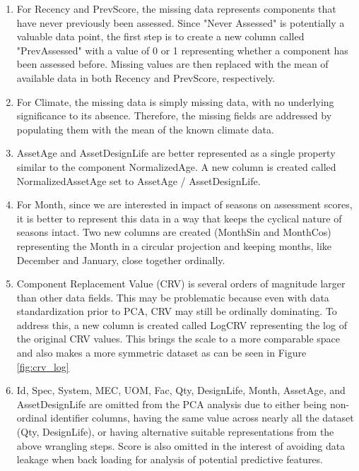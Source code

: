 \documentclass[NewProceedings,letterpaper,NoPageNumbers,NoLineNumbers, DoubleSpace]{ascelike-new}
\begin{document}
\begin{enumerate}
    \item For Recency and PrevScore, the missing data represents components that have never previously been assessed. Since "Never Assessed" is potentially a valuable data point, the first step is to create a new column called "PrevAssessed" with a value of 0 or 1 representing whether a component has been assessed before.  Missing values are then replaced with the mean of available data in both Recency and PrevScore, respectively.
    \item For Climate, the missing data is simply missing data, with no underlying significance to its absence. Therefore, the missing fields are addressed by populating them with the mean of the known climate data.
    \item AssetAge and AssetDesignLife are better represented as a single property similar to the component NormalizedAge.  A new column is created called NormalizedAssetAge set to AssetAge / AssetDesignLife.
    \item For Month, since we are interested in impact of seasons on assessment scores, it is better to represent this data in a way that keeps the cyclical nature of seasons intact. Two new columns are created (MonthSin and MonthCos) representing the Month in a circular projection and keeping months, like December and January, close together ordinally.
    \item Component Replacement Value (CRV) is several orders of magnitude larger than other data fields. This may be problematic because even with data standardization prior to PCA, CRV may still be ordinally dominating. To address this, a new column is created called LogCRV representing the log of the original CRV values.  This brings the scale to a more comparable space and also makes a more symmetric dataset as can be seen in Figure \ref{fig:crv_log}
    \item Id, Spec, System, MEC, UOM, Fac, Qty, DesignLife, Month, AssetAge, and AssetDesignLife are omitted from the PCA analysis due to either being non-ordinal identifier columns, having the same value across nearly all the dataset (Qty, DesignLife), or having alternative suitable representations from the above wrangling steps.  Score is also omitted in the interest of avoiding data leakage when back loading for analysis of potential predictive features. 
\end{enumerate}
\end{document}
